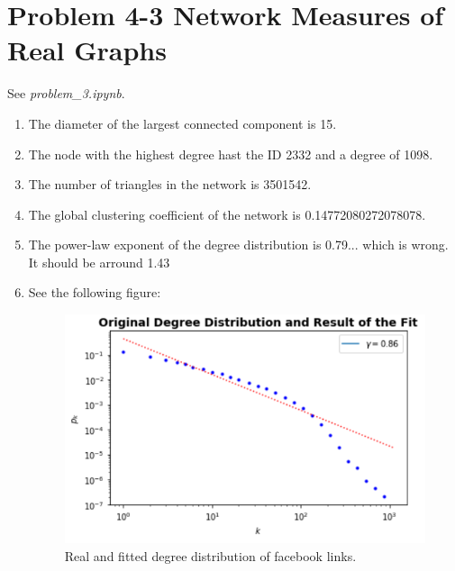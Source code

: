 \section{Problem 4-3 Network Measures of Real Graphs}
See \textit{problem\_3.ipynb}.

\begin{enumerate}
	\item The diameter of the largest connected component is 15.
	\item The node with the highest degree hast the ID 2332 and a degree of 1098.
	\item The number of triangles in the network is 3501542.
	\item The global clustering coefficient of the network is 0.14772080272078078.
	\item The power-law exponent of the degree distribution is 0.79...  which is wrong.  It should be arround 1.43
	\item See the following figure:
	
	\begin{figure}[h]
		\centering
		\includegraphics[width=0.9\linewidth]{images/problem43_degree_distribution.png}
		\caption{Real and fitted degree distribution of facebook links.}
		\label{distribution}
	\end{figure}
\end{enumerate}

